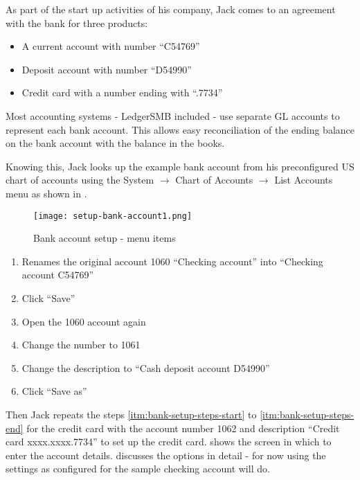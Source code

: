 As part of the start up activities of his company, Jack comes to an agreement with the
bank for three products:

\begin{itemize}
\item A current account with number ``C54769''
\item Deposit account with number ``D54990''
\item Credit card with a number ending with ``.7734''
\end{itemize}

Most accounting systems - LedgerSMB included - use separate GL accounts to represent
each bank account. This allows easy reconciliation of the ending balance on the bank
account with the balance in the books.

Knowing this, Jack looks up the example bank account from his preconfigured US chart of
accounts using the System $\rightarrow$ Chart of Accounts $\rightarrow$ List Accounts menu as
shown in .

\begin{figure}[h]
\texttt{[image: setup-bank-account1.png]}
\caption{Bank account setup - menu items}
\label{fig:bank-setup1}
\end{figure}



\begin{enumerate}
\item Renames the original account 1060 ``Checking account'' into ``Checking account C54769''
\item Click ``Save''
\item Open the 1060 account again
\label{itm:bank-setup-steps-start}
\item Change the number to 1061
\item Change the description to ``Cash deposit account D54990''
\item Click ``Save as''
\label{itm:bank-setup-steps-end}
\end{enumerate}

Then Jack repeats the steps \ref{itm:bank-setup-steps-start} to \ref{itm:bank-setup-steps-end}
for the credit card with the account number 1062 and description ``Credit card xxxx.xxxx.7734'' to set
up the credit card.  shows the screen in which to enter the account
details.  discusses the options in detail - for now using the
settings as configured for the sample checking account will do.

